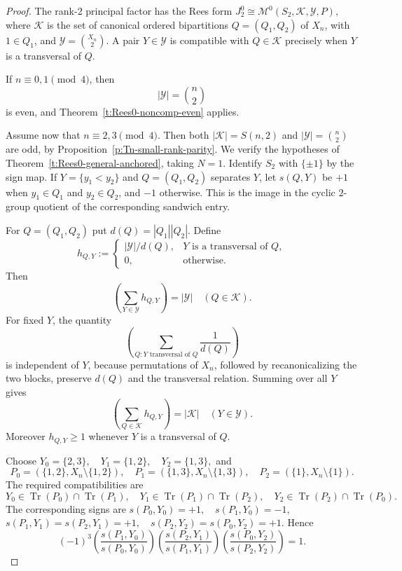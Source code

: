 \documentclass[11pt]{article}
\theoremstyle{plain}
\theoremstyle{remark}
\theoremstyle{definition}
\theoremstyle{plain}
\DeclareMathOperator{\Tr}{Tr}
\begin{document}
\begin{proof}
The rank-2 principal factor has the Rees form
\(J_2^0\cong \mathcal M^0(S_2,\mathcal K,\mathcal Y,P),\)
where $\mathcal K$ is the set of canonical ordered bipartitions
$Q=(Q_1,Q_2)$ of $X_n$, with $1\in Q_1$, and
$\mathcal Y=\binom{X_n}{2}$. A pair $Y\in\mathcal Y$ is compatible with
$Q\in\mathcal K$ precisely when $Y$ is a transversal of $Q$.

If $n\equiv0,1\pmod4$, then
\[
        |\mathcal Y|=\binom n2
\]
is even, and Theorem~\ref{t:Rees0-noncomp-even} applies.

Assume now that $n\equiv2,3\pmod4$. Then both $|\mathcal K|=S(n,2)$ and
$|\mathcal Y|=\binom n2$ are odd, by
Proposition~\ref{p:Tn-small-rank-parity}. We verify the hypotheses of
Theorem~\ref{t:Rees0-general-anchored}, taking $N=1$. Identify $S_2$ with $\{\pm1\}$ by the
sign map. If $Y=\{y_1<y_2\}$ and $Q=(Q_1,Q_2)$ separates $Y$, let $s(Q,Y)$ be
$+1$ when $y_1\in Q_1$ and $y_2\in Q_2$, and $-1$ otherwise. This is the image
in the cyclic $2$-group quotient of the corresponding sandwich entry.

For $Q=(Q_1,Q_2)$ put
\(d(Q)=|Q_1||Q_2|.\)
Define
\[
        h_{Q,Y}:=
        \begin{cases}
        |\mathcal Y|/d(Q), & Y\text{ is a transversal of }Q,\\
        0, & \text{otherwise}.
        \end{cases}
\]
Then
\[
\left(\sum_{Y\in\mathcal Y}h_{Q,Y}\right)=|\mathcal Y|
        \quad(Q\in\mathcal K).
\]
For fixed $Y$, the quantity
\[
        \left(\sum_{Q:Y\text{ transversal of }Q}\frac1{d(Q)}\right)
\]
is independent of $Y$, because permutations of $X_n$, followed by
recanonicalizing the two blocks, preserve $d(Q)$ and the transversal relation.
Summing over all $Y$ gives
\[
\left(\sum_{Q\in\mathcal K}h_{Q,Y}\right)=|\mathcal K|
        \quad(Y\in\mathcal Y).
\]
Moreover $h_{Q,Y}\ge1$ whenever $Y$ is a transversal of $Q$.

Choose
\(Y_0=\{2,3\}, \quad Y_1=\{1,2\}, \quad Y_2=\{1,3\},\)
and
\[
P_0=(\{1,2\},X_n\setminus\{1,2\}),
        \quad
        P_1=(\{1,3\},X_n\setminus\{1,3\}),
        \quad
        P_2=(\{1\},X_n\setminus\{1\}).
\]
The required compatibilities are
\[
Y_0\in\Tr(P_0)\cap\Tr(P_1),
        \quad
        Y_1\in\Tr(P_1)\cap\Tr(P_2),
        \quad
        Y_2\in\Tr(P_2)\cap\Tr(P_0).
\]
The corresponding signs are
\(s(P_0,Y_0)=+1, \quad s(P_1,Y_0)=-1,\)
\(s(P_1,Y_1)=s(P_2,Y_1)=+1, \quad s(P_2,Y_2)=s(P_0,Y_2)=+1.\)
Hence
\[
        (-1)^3
        \left(\frac{s(P_1,Y_0)}{s(P_0,Y_0)}\right)
        \left(\frac{s(P_2,Y_1)}{s(P_1,Y_1)}\right)
        \left(\frac{s(P_0,Y_2)}{s(P_2,Y_2)}\right)=1.
\]


\end{proof}
\end{document}
